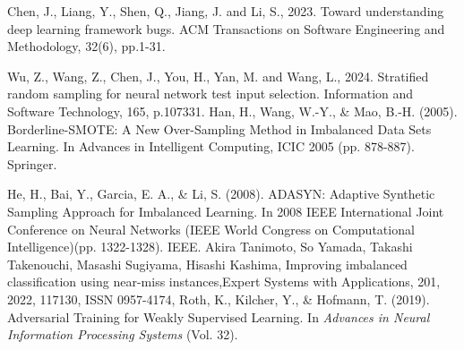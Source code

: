\begin{singlespace}
\begin{thebibliography}{}
Chen, J., Liang, Y., Shen, Q., Jiang, J. and Li, S., 2023. Toward understanding deep learning framework bugs. ACM Transactions on Software Engineering and Methodology, 32(6), pp.1-31.


     Wu, Z., Wang, Z., Chen, J., You, H., Yan, M. and Wang, L., 2024. Stratified random sampling for neural network test input selection. Information and Software Technology, 165, p.107331.
     Han, H., Wang, W.-Y., \& Mao, B.-H. (2005). Borderline-SMOTE: A New Over-Sampling Method in Imbalanced Data Sets Learning. In Advances in Intelligent Computing, ICIC 2005 (pp. 878-887). Springer.

     He, H., Bai, Y., Garcia, E. A., \& Li, S. (2008). ADASYN: Adaptive Synthetic Sampling Approach for Imbalanced Learning. In 2008 IEEE International Joint Conference on Neural Networks (IEEE World Congress on Computational Intelligence)(pp. 1322-1328). IEEE.
     Akira Tanimoto, So Yamada, Takashi Takenouchi, Masashi Sugiyama, Hisashi Kashima, Improving imbalanced classification using near-miss instances,Expert Systems with Applications, 201, 2022, 117130, ISSN 0957-4174, 
     Roth, K., Kilcher, Y., \& Hofmann, T. (2019). Adversarial Training for Weakly Supervised Learning. In \textit{Advances in Neural Information Processing Systems} (Vol. 32).








    


    









\end{thebibliography}
\end{singlespace}

